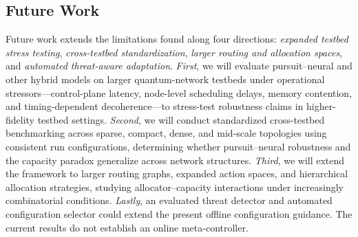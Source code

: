 

\subsection{Future Work}

Future work extends the limitations found along four directions: \textit{expanded testbed stress testing}, \textit{cross-testbed standardization}, \textit{larger routing and allocation spaces}, and \textit{automated threat-aware adaptation}. \textit{First}, we will evaluate pursuit--neural and other hybrid models on larger quantum-network testbeds under operational stressors---control-plane latency, node-level scheduling delays, memory contention, and timing-dependent decoherence---to stress-test robustness
claims in higher-fidelity testbed settings. \textit{Second}, we will conduct standardized cross-testbed benchmarking across sparse, compact, dense, and mid-scale topologies using consistent run configurations, determining whether pursuit--neural robustness and the capacity paradox generalize across network structures. \textit{Third}, we will extend the framework to larger routing graphs, expanded action spaces, and hierarchical allocation strategies, studying allocator--capacity interactions under increasingly combinatorial conditions. \textit{Lastly}, an evaluated threat detector and automated configuration selector could extend the present offline configuration guidance. The current results do not establish an online meta-controller.



